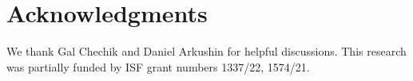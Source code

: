 \section*{Acknowledgments}

We thank Gal Chechik and Daniel Arkushin for helpful discussions.
This research was partially funded by ISF grant numbers 1337/22, 1574/21.